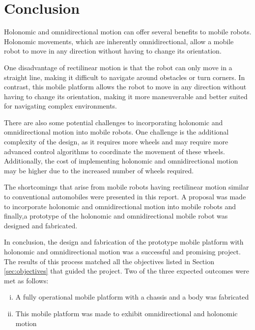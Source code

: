 \section{Conclusion}

Holonomic and omnidirectional motion can offer several benefits to mobile robots. Holonomic movements, which are inherently omnidirectional, allow a mobile robot to move in any direction without having to change its orientation. 

One disadvantage of rectilinear motion is that the robot can only move in a straight line, making it difficult to navigate around obstacles or turn corners. In contrast, this mobile platform allows the robot to move in any direction without having to change its orientation, making it more maneuverable and better suited for navigating complex environments.

There are also some potential challenges to incorporating holonomic and omnidirectional motion into mobile robots. One challenge is the additional complexity of the design, as it requires more wheels and may require more advanced control algorithms to coordinate the movement of these wheels. Additionally, the cost of implementing holonomic and omnidirectional motion may be higher due to the increased number of wheels required.

The shortcomings that arise from mobile robots having rectilinear motion similar to conventional automobiles were presented in this report. A proposal was made to incorporate holonomic and omnidirectional motion into mobile robots and finally,a prototype of the holonomic and omnidirectional mobile robot was designed and fabricated. 

\par
In conclusion, the design and fabrication of the prototype mobile platform with holonomic and omnidirectional motion was a successful and promising project. The results of this process matched all the objectives listed in Section \ref{sec:objectives} that guided the project. Two of the three expected outcomes were met as follows:
\begin{enumerate}[i.]
    \item A fully operational mobile platform with a chassis and a body was fabricated
    \item This mobile platform was made to exhibit omnidirectional and holonomic motion
\end{enumerate}

